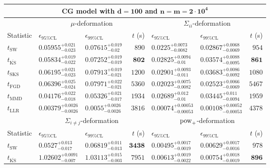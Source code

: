 \begin{tabular}{l|llr|llr}
	\toprule
	\multicolumn{7}{c}{{\bf CG model with $\mathbf{d=100}$ and $\mathbf{n=m=2\cdot 10^{4}}$}} \\
	\toprule
	\multicolumn{1}{c}{} & \multicolumn{3}{c}{$\mu$-deformation} & \multicolumn{3}{c}{$\Sigma_{ii}$-deformation} \\
	Statistic & $\epsilon_{95\%\mathrm{CL}}$ & $\epsilon_{99\%\mathrm{CL}}$ & $t$ (s) & $\epsilon_{95\%\mathrm{CL}}$ & $\epsilon_{99\%\mathrm{CL}}$ & $t$ (s) \\
	\midrule
	$t_{\mathrm{SW}}$ & $0.05955_{-0.023}^{+0.021}$ & $0.07615_{-0.02}^{+0.019}$ & $890$ & $0.0225_{-0.0082}^{+0.0073}$ & $0.02867_{-0.0069}^{+0.0068}$ & $954$ \\
	$t_{\overline{\mathrm{KS}}}$ & $0.05834_{-0.022}^{+0.019}$ & $0.07252_{-0.019}^{+0.019}$ & ${\mathbf{802}}$ & $0.02825_{-0.01}^{+0.0094}$ & $0.03574_{-0.0095}^{+0.0088}$ & ${\mathbf{861}}$ \\
	$t_{\mathrm{SKS}}$ & $0.06195_{-0.023}^{+0.021}$ & $0.07913_{-0.021}^{+0.019}$ & $1200$ & $0.02901_{-0.011}^{+0.0093}$ & $0.03683_{-0.0092}^{+0.0086}$ & $1080$ \\
	$t_{\mathrm{FGD}}$ & $0.06396_{-0.024}^{+0.025}$ & $0.07971_{-0.021}^{+0.022}$ & $5360$ & ${\mathbf{0.02023_{-0.0082}^{+0.0075}}}$ & ${\mathbf{0.02523_{-0.0069}^{+0.0066}}}$ & $5467$ \\
	$t_{\mathrm{MMD}}$ & ${\mathbf{0.04176_{-0.018}^{+0.022}}}$ & ${\mathbf{0.05326_{-0.017}^{+0.021}}}$ & $1934$ & $0.02689_{-0.01}^{+0.012}$ & $0.03445_{-0.0094}^{+0.011}$ & $1959$ \\
	$t_{\mathrm{LLR}}$ & $0.00379_{-0.0026}^{+0.0026}$ & $0.0055_{-0.0026}^{+0.0026}$ & $3816$ & $0.00074_{-0.00053}^{+0.00053}$ & $0.00108_{-0.00053}^{+0.00052}$ & $4378$ \\
	\toprule
	\multicolumn{1}{c}{} & \multicolumn{3}{c}{$\Sigma_{i\neq j}$-deformation} & \multicolumn{3}{c}{$\rm{pow}_{+}$-deformation} \\
	Statistic & $\epsilon_{95\%\mathrm{CL}}$ & $\epsilon_{99\%\mathrm{CL}}$ & $t$ (s) & $\epsilon_{95\%\mathrm{CL}}$ & $\epsilon_{99\%\mathrm{CL}}$ & $t$ (s) \\
	\midrule
	$t_{\mathrm{SW}}$ & $0.0527_{-0.017}^{+0.013}$ & $0.06819_{-0.013}^{+0.011}$ & ${\mathbf{3438}}$ & $0.00495_{-0.0019}^{+0.0017}$ & $0.00629_{-0.0016}^{+0.0017}$ & $978$ \\
	$t_{\overline{\mathrm{KS}}}$ & $1.02602_{-0.007}^{+0.0091}$ & $1.03113_{-0.003}^{+0.015}$ & $7951$ & $0.00613_{-0.0022}^{+0.0019}$ & $0.00754_{-0.0019}^{+0.0018}$ & ${\mathbf{896}}$ \\

\end{tabular}
